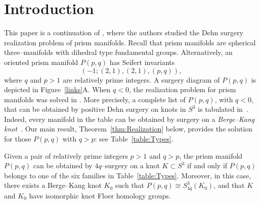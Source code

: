 \section{Introduction}\label{sec:Introduction}

This paper is a continuation of \cite{Prism2016}, where the authors studied the Dehn surgery realization problem of prism manifolds. Recall that prism manifolds are spherical three--manifolds with dihedral type fundamental groups.
Alternatively, an oriented prism manifold $P(p,q)$ has Seifert invariants 
\[
(-1; (2,1), (2,1), (p,q)),
\]
where $q$ and $p>1$ are relatively prime integers. A surgery diagram of $P(p,q)$ is depicted in Figure~\ref{links}A. 
When $q<0$, the realization problem for prism manifolds was solved in \cite{Prism2016}. More precisely, a complete list of $P(p,q)$, with $q < 0$, that can be obtained by positive Dehn surgery on knots in $S^3$ is tabulated in~\cite[Table~1]{Prism2016}. Indeed, every manifold in the table can be obtained by surgery on a {\it Berge--Kang knot}~\cite{BergeKang}.
 Our main result, Theorem~\ref{thm:Realization} below, provides the solution for those $P(p,q)$ with $q>p$: see Table~\ref{table:Types}.

\begin{theorem}\label{thm:Realization}
Given a pair of relatively prime integers $p>1$ and $q>p$, the prism manifold $P(p,q)$ can be obtained by $4q$--surgery on a knot $K\subset S^3$ if and only if $P(p,q)$ belongs to one of the six families in Table~\ref{table:Types}. Moreover, in this case, there exists a Berge--Kang knot $K_0$ such that $P(p,q)\cong S^3_{4q}(K_0)$, and that $K$ and $K_0$ have isomorphic knot Floer homology groups.
\end{theorem}


